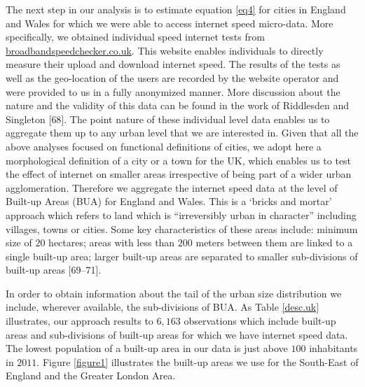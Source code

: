 \documentclass[10pt,letterpaper]{article}
\begin{document}
The next step in our analysis is to estimate equation \ref{eq4} for
cities in England and Wales for which we were able to access internet
speed micro-data. More specifically, we obtained individual speed
internet tests from
\href{https://www.broadbandspeedchecker.co.uk/}{broadbandspeedchecker.co.uk}.
This website enables individuals to directly measure their upload and
download internet speed. The results of the tests as well as the
geo-location of the users are recorded by the website operator and were
provided to us in a fully anonymized manner. More discussion about the
nature and the validity of this data can be found in the work of
Riddlesden and Singleton {[}68{]}. The point nature of these individual
level data enables us to aggregate them up to any urban level that we
are interested in. Given that all the above analyses focused on
functional definitions of cities, we adopt here a morphological
definition of a city or a town for the UK, which enables us to test the
effect of internet on smaller areas irrespective of being part of a
wider urban agglomeration. Therefore we aggregate the internet speed
data at the level of Built-up Areas (BUA) for England and Wales. This is
a `bricks and mortar' approach which refers to land which is
``irreversibly urban in character'' including villages, towns or cities.
Some key characteristics of these areas include: minimum size of \(20\)
hectares; areas with less than \(200\) meters between them are linked to
a single built-up area; larger built-up areas are separated to smaller
sub-divisions of built-up areas {[}69--71{]}.

In order to obtain information about the tail of the urban size
distribution we include, wherever available, the sub-divisions of BUA.
As Table \ref{desc.uk} illustrates, our approach results to \(6,163\)
observations which include built-up areas and sub-divisions of built-up
areas for which we have internet speed data. The lowest population of a
built-up area in our data is just above \(100\) inhabitants in \(2011\).
Figure \ref{figure1} illustrates the built-up areas we use for the
South-East of England and the Greater London Area.
\end{document}
